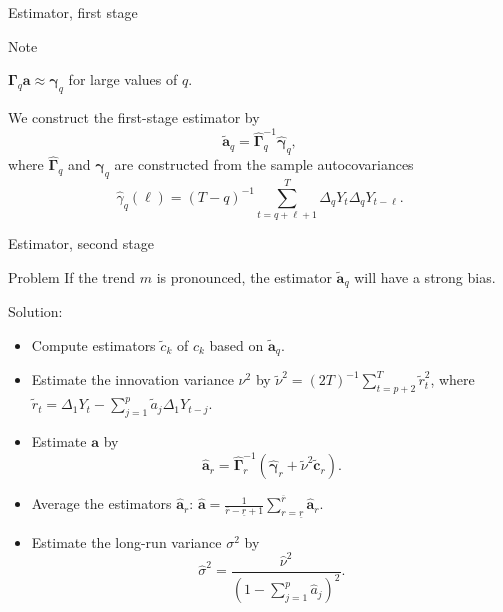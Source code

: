\documentclass[10pt, handout]{beamer}
\begin{document}
\begin{frame}{Estimator, first stage}

\begin{block}{Note}
\vspace{-3mm}
\begin{center}
$\boldsymbol{\Gamma}_q \boldsymbol{a} \approx \boldsymbol{\gamma}_q$ for large values of $q$.
\vspace{-3mm}
\end{center}\end{block}\pause

We construct the first-stage estimator by
\begin{equation*}
\widetilde{\boldsymbol{a}}_q = \widehat{\boldsymbol{\Gamma}}_q^{-1} \widehat{\boldsymbol{\gamma}}_q, 
\end{equation*}
where $\widehat{\boldsymbol{\Gamma}}_q$ and $\widehat{\boldsymbol{\gamma}}_q$ are constructed from the sample autocovariances $$\widehat{\gamma}_q(\ell) = (T-q)^{-1} \sum_{t=q+\ell+1}^T \Delta_q Y_{t} \Delta_q Y_{t-\ell}.$$ 
\end{frame}



\begin{frame}{Estimator, second stage}
\begin{block}{Problem}
If the trend $m$ is pronounced, the estimator $\widetilde{\boldsymbol{a}}_q$ will have a strong bias.
\end{block}\pause
\vspace{-2mm}
Solution:
\begin{itemize}
	\item \vspace{-2mm} Compute estimators $\widetilde{c}_k$ of $c_k$ based on $\widetilde{\boldsymbol{a}}_q$.\pause
	\item Estimate the innovation variance $\nu^2$ by $\widetilde{\nu}^2 = (2T)^{-1} \sum_{t=p+2}^T \widetilde{r}_{t}^2$, where $\widetilde{r}_{t} = \Delta_1 Y_{t} - \sum_{j=1}^p \widetilde{a}_j \Delta_1 Y_{t-j}$.\pause
	\item Estimate $\boldsymbol{a}$ by 
\begin{equation*}\label{est-AR-SS} 
\widehat{\boldsymbol{a}}_r = \widehat{\boldsymbol{\Gamma}}_r^{-1} (\widehat{\boldsymbol{\gamma}}_r + \widetilde{\nu}^2 \widetilde{\boldsymbol{c}}_r).
\end{equation*}\pause
	\item \vspace{-4mm} Average the estimators $\widehat{\boldsymbol{a}}_r$: $\widehat{\boldsymbol{a}} = \frac{1}{\overline{r} - \underline{r} + 1} \sum\limits_{r=\underline{r}}^{\overline{r}} \widehat{\boldsymbol{a}}_r$.\pause
	\item Estimate the long-run variance $\sigma^2$ by 
\begin{equation*} \label{est-lrv}
\widehat{\sigma}^2 = \frac{\widehat{\nu}^2}{(1 - \sum_{j=1}^p \widehat{a}_j)^2}. 
\end{equation*}
\end{itemize}
\end{frame}
\end{document}
